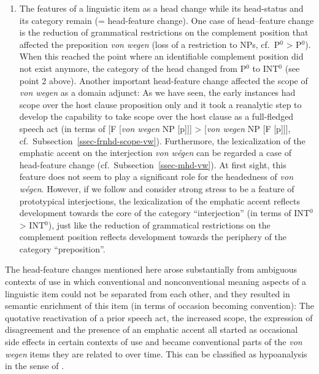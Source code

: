 \documentclass[output=paper
  ,nobabel
  ,draftmode
  ,babelshorthands
  ,colorlinks, citecolor=brown
]{langscibook}
\begin{document}
\begin{enumerate}
    \item The features of a linguistic item as a head change while its head-status and its category remain (= head-feature change). One case of head--feature change is the reduction of grammatical restrictions on the complement position that affected the preposition \emph{von wegen} (loss of a restriction to NPs, cf.\ P$^0$ > P$^0$). When this reached the point where an identifiable complement position did not exist anymore, the category of the head changed from P$^0$ to INT$^0$ (see point 2 above). Another important head-feature change affected the scope of \emph{von wegen} as a domain adjunct: As we have seen, the early instances had scope over the host clause proposition only and it took a reanalytic step to develop the capability to take scope over the host clause as a full-fledged speech act (in terms of [F [\emph{von wegen} NP [p]]] > [\emph{von wegen} NP [F [p]]], cf.\ Subsection~\ref{ssec-frnhd-scope-vw}). Furthermore, the lexicalization of the emphatic accent on the interjection \emph{von wégen} can be regarded a case of head-feature change (cf.\ Subsection~\ref{ssec-mhd-vw}). At first sight, this feature does not seem to play a significant role for the headedness of \emph{von wégen}. However, if we follow \citet[18]{Nuebling2004} and consider strong stress to be a feature of prototypical interjections, the lexicalization of the emphatic accent reflects development towards the core of the category ``interjection'' (in terms of INT$^0$ > INT$^0$), just like the reduction of grammatical restrictions on the complement position reflects development towards the periphery of the category “preposition”.
\end{enumerate}

\largerpage
\noindent
The head-feature changes mentioned here arose substantially from ambiguous contexts of use in which
conventional and nonconventional meaning aspects of a linguistic item could not be separated from
each other, and they resulted in semantic enrichment of this item (in terms of occasion becoming
convention): The quotative reactivation of a prior speech act, the increased scope, the expression
of disagreement and the presence of an emphatic accent all started as occasional side effects in
certain contexts of use and became conventional parts of the \emph{von wegen} items they are related
to over time. This can be classified as hypoanalysis in the sense of
\citet[126–130]{Croft2000}.%
\end{document}
